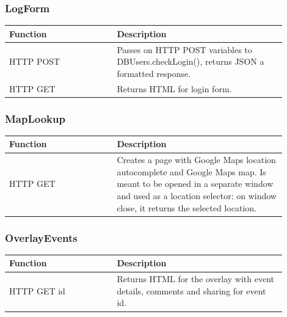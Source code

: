 \subsubsection{LogForm}
\begin{minipage}{\linewidth}
  \centering
  \setlength{\tabcolsep}{12pt}
  \begin{tabular}{|p{0.35\linewidth}|p{0.55\linewidth}|}
  \hline
  \cellcolor{gray!25} Function & \cellcolor{gray!25} Description \\
  \hline
  HTTP POST & Passes on HTTP POST variables to DBUsers.checkLogin(), returns JSON a formatted response. \\
  HTTP GET & Returns HTML for login form. \\
  \hline
  \end{tabular}
\end{minipage}

\subsubsection{MapLookup}
\begin{minipage}{\linewidth}
  \centering
  \setlength{\tabcolsep}{12pt}
  \begin{tabular}{|p{0.35\linewidth}|p{0.55\linewidth}|}
  \hline
  \cellcolor{gray!25} Function & \cellcolor{gray!25} Description \\
  \hline
  HTTP GET & Creates a page with Google Maps location autocomplete and Google Maps map. Is meant to be opened in a separate window and used as a location selector: on window close, it returns the selected location. \\
  \hline
  \end{tabular}
\end{minipage}

\subsubsection{OverlayEvents}
\begin{minipage}{\linewidth}
  \centering
  \setlength{\tabcolsep}{12pt}
  \begin{tabular}{|p{0.35\linewidth}|p{0.55\linewidth}|}
  \hline
  \cellcolor{gray!25} Function & \cellcolor{gray!25} Description \\
  \hline
  HTTP GET id & Returns HTML for the overlay with event details, comments and sharing for event id. \\
  \hline
  \end{tabular}
\end{minipage}

